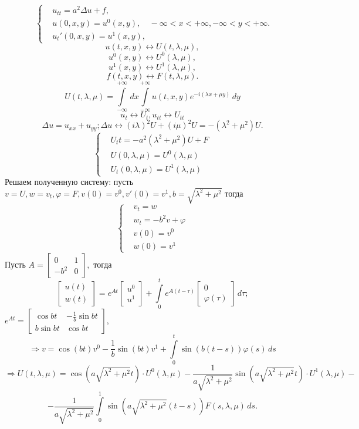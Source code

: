 \[ \left\lbrace \begin{aligned}
    & u_{tt} = a^2 \Delta u + f, \\
    & u(0, x, y) = u^0 (x, y), \\
    & u_t'(0, x, y) = u^1 (x, y),
\end{aligned} \right. -\infty < x < +\infty, -\infty < y < +\infty. \]
\[ u(t, x, y) \leftrightarrow U(t, \lambda, \mu), \]
\[ u^0(x, y) \leftrightarrow U^0(\lambda, \mu), \]
\[ u^1(x, y) \leftrightarrow U^1(\lambda, \mu), \]
\[ f(t, x, y) \leftrightarrow F(t, \lambda, \mu). \]
\[ U(t, \lambda, \mu) = \int \limits_{-\infty}^{+\infty} \, dx \int \limits_{-\infty}^{+\infty} u(t, x, y) e^{-i(\lambda x + \mu y)} \, dy \]
\[ u_t \leftrightarrow U_t, u_{tt} \leftrightarrow U_{tt} \]
\[ \Delta u = u_{xx} + u_{yy}; \Delta u \leftrightarrow (i \lambda)^2 U + (i \mu)^2 U = -(\lambda^2 + \mu^2) U. \]
\[ \left\lbrace \begin{aligned}
    & U_tt = -a^2 (\lambda^2 + \mu^2) U + F \\
    & U(0, \lambda, \mu) = U^0(\lambda, \mu) \\
    & U_t(0, \lambda, \mu) = U^1(\lambda, \mu)
\end{aligned} \right. \]
Решаем полученную систему: пусть \( v = U, w = v_t, \varphi = F, v(0) = v^0, v'(0) = v^1, b = \sqrt{\lambda^2 + \mu^2} \) тогда 
\[ \left\lbrace \begin{aligned} 
    & v_t = w  \\
    & w_t = -b^2 v + \varphi \\
    & v(0) = v^0 \\
    & w(0) = v^1
\end{aligned} \right. \]
Пусть
\( A = \begin{bmatrix}
    0 & 1 \\
    -b^2 & 0
\end{bmatrix}, \)
тогда
\[ \begin{bmatrix} u(t) \\ w(t) \end{bmatrix} = e^{At} \begin{bmatrix} u^0 \\ u^1 \end{bmatrix} + \int \limits_0^t e^{A(t - \tau)} \begin{bmatrix} 0 \\ \varphi(\tau) \end{bmatrix} \, d\tau; \]
\( e^{At} = \begin{bmatrix}
    \cos{bt} & -\frac{1}{b} \sin{bt} \\
    b \sin{bt} & \cos{bt}
\end{bmatrix} \),
\[ \Rightarrow v = \cos{(bt)} v^0 - \dfrac{1}{b} \sin{(bt)} v^1 + \int \limits_0^t \sin{(b (t - s))} \varphi(s) \, ds \]
\[ \Rightarrow U(t, \lambda, \mu) = \cos{(a \sqrt{\lambda^2 + \mu^2} t)} \cdot U^0(\lambda, \mu) -\dfrac{1}{a \sqrt{\lambda^2 + \mu^2}} \sin{(a \sqrt{\lambda^2 + \mu^2} t)} \cdot U^1(\lambda, \mu) - \]
\[ - \dfrac{1}{a \sqrt{\lambda^2 + \mu^2}} \int \limits_0^1 \sin{(a \sqrt{\lambda^2 + \mu^2} (t - s))} F(s, \lambda, \mu) \, ds. \]

